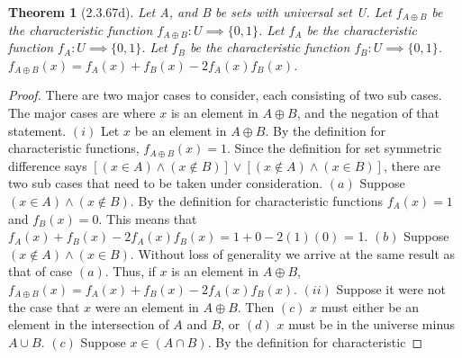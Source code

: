 \documentclass[a4paper, 12pt]{article}
\theoremstyle{plain}
\newtheorem*{theorem*}{Theorem}
\begin{document}
	
	\begin{theorem*}[2.3.67d]
		Let A, and B be sets with universal set U. Let $f_{A \oplus B}$ be the characteristic 
		function $f_{A \oplus B}: U \implies \{0, 1\}$. Let $f_{A}$ be the characteristic function 
		$f_{A}: U \implies \{0, 1\}$. Let $f_{B}$ be the characteristic function \newline 
		$f_{B}: U \implies \{0, 1\}$. $f_{A \oplus B}(x) = f_{A}(x) + f_{B}(x) - 2f_{A}(x)f_{B}(x)$.
	\end{theorem*}
	
	\begin{proof}
		There are two major cases to consider, each consisting of two sub cases. The major cases are 
		where $x$ is an element in $A \oplus B$, and the negation of that statement.
		\newline
		\newline
		$(i)$ Let $x$ be an element in $A \oplus B$. By the definition for \newline characteristic 
		functions, $f_{A \oplus B}(x) = 1$. Since the definition for set symmetric difference says 
		$[(x \in A) \land (x \notin B)] \lor [(x \notin A) \land (x \in B)]$, there are two sub cases 
		that need to be taken under consideration. \newline \newline \indent $(a)$ Suppose 
		$(x \in A) \land (x \notin B)$. By the definition for characteristic \indent functions 
		$f_{A}(x) = 1$ and $f_{B}(x) = 0$. This means that \newline \indent 
		$f_{A}(x) + f_{B}(x) - 2f_{A}(x)f_{B}(x) = 1 + 0 - 2(1)(0)$ = 1. 
		\newline \newline \indent $(b)$ Suppose $(x \notin A) \land (x \in B)$. Without loss of 
		generality we arrive \indent at the same result as that of case $(a)$.
		\newline
		\newline
		Thus, if $x$ is an element in $A \oplus B$, 
		$f_{A \oplus B}(x) = f_{A}(x) + f_{B}(x) - 2f_{A}(x)f_{B}(x)$.
		\newline
		\newline
		$(ii)$ Suppose it were not the case that $x$ were an element in $A \oplus B$. Then $(c)$ $x$ 
		must either be an element in the intersection of $A$ and $B$, or $(d)$ $x$ must be in the 
		universe minus $A \cup B$.
		\newline
		\newline \indent $(c)$ Suppose $x \in (A \cap B)$. By the definition for characteristic \newline 

\end{proof}
\end{document}
